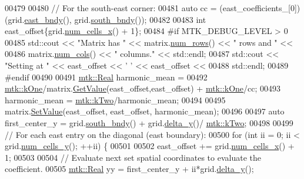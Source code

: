 \begin{DoxyCode}
00479 
00480   \textcolor{comment}{// For the south-east corner:}
00481   \textcolor{keyword}{auto} cc = (east\_coefficients\_[0])(grid.\hyperlink{classmtk_1_1UniStgGrid2D_a03f689eb29a6369b82ce1207c655d5ff}{east\_bndy}(), grid.\hyperlink{classmtk_1_1UniStgGrid2D_a1442eaf219f099d0ebf46a170fdebf92}{south\_bndy}());
00482 
00483   \textcolor{keywordtype}{int} east\_offset\{grid.\hyperlink{classmtk_1_1UniStgGrid2D_a2d182866a398aba8e4829590e85bf939}{num\_cells\_x}() + 1\};
00484 \textcolor{preprocessor}{  #if MTK\_DEBUG\_LEVEL > 0}
00485   std::cout << \textcolor{stringliteral}{"Matrix has "} << matrix.\hyperlink{classmtk_1_1DenseMatrix_a53f3afb3b6a8d21854458aaa9663cc74}{num\_rows}() << \textcolor{stringliteral}{" rows and "} <<
00486     matrix.\hyperlink{classmtk_1_1DenseMatrix_a41747502d468c6728a4be31501b16e0e}{num\_cols}() << \textcolor{stringliteral}{" columns."} << std::endl;
00487   std::cout << \textcolor{stringliteral}{"Setting at "} << east\_offset << \textcolor{charliteral}{' '} << east\_offset <<
00488     std::endl;
00489 \textcolor{preprocessor}{  #endif}
00490 
00491   \hyperlink{group__c01-roots_gac080bbbf5cbb5502c9f00405f894857d}{mtk::Real} harmonic\_mean =
00492     \hyperlink{group__c01-roots_ga26407c24d43b6b95480943340d285c71}{mtk::kOne}/matrix.\hyperlink{classmtk_1_1DenseMatrix_a4b23ecbebd970b5eea915dbb50691024}{GetValue}(east\_offset,east\_offset) + 
      \hyperlink{group__c01-roots_ga26407c24d43b6b95480943340d285c71}{mtk::kOne}/cc;
00493   harmonic\_mean = \hyperlink{group__c01-roots_gaf39c2d851a2db744f4feb1c5ab3ec2cf}{mtk::kTwo}/harmonic\_mean;
00494 
00495   matrix.\hyperlink{classmtk_1_1DenseMatrix_a784ce5784109ac86bfb9d8562b334b13}{SetValue}(east\_offset, east\_offset, harmonic\_mean);
00496 
00497   \textcolor{keyword}{auto} first\_center\_y = grid.\hyperlink{classmtk_1_1UniStgGrid2D_a1442eaf219f099d0ebf46a170fdebf92}{south\_bndy}() + grid.\hyperlink{classmtk_1_1UniStgGrid2D_a65a78cfc80ffdbeb282ed57af4dc5cb4}{delta\_y}()/
      \hyperlink{group__c01-roots_gaf39c2d851a2db744f4feb1c5ab3ec2cf}{mtk::kTwo};
00498 
00499   \textcolor{comment}{// For each east entry on the diagonal (east boundary):}
00500   \textcolor{keywordflow}{for} (\textcolor{keywordtype}{int} ii = 0; ii < grid.\hyperlink{classmtk_1_1UniStgGrid2D_aed05a801cc9a76dba0ff203cea58a61a}{num\_cells\_y}(); ++ii) \{
00501 
00502     east\_offset += grid.\hyperlink{classmtk_1_1UniStgGrid2D_a2d182866a398aba8e4829590e85bf939}{num\_cells\_x}() + 1;
00503 
00504     \textcolor{comment}{// Evaluate next set spatial coordinates to evaluate the coefficient.}
00505     \hyperlink{group__c01-roots_gac080bbbf5cbb5502c9f00405f894857d}{mtk::Real} yy = first\_center\_y + ii*grid.\hyperlink{classmtk_1_1UniStgGrid2D_a65a78cfc80ffdbeb282ed57af4dc5cb4}{delta\_y}();

\end{DoxyCode}
